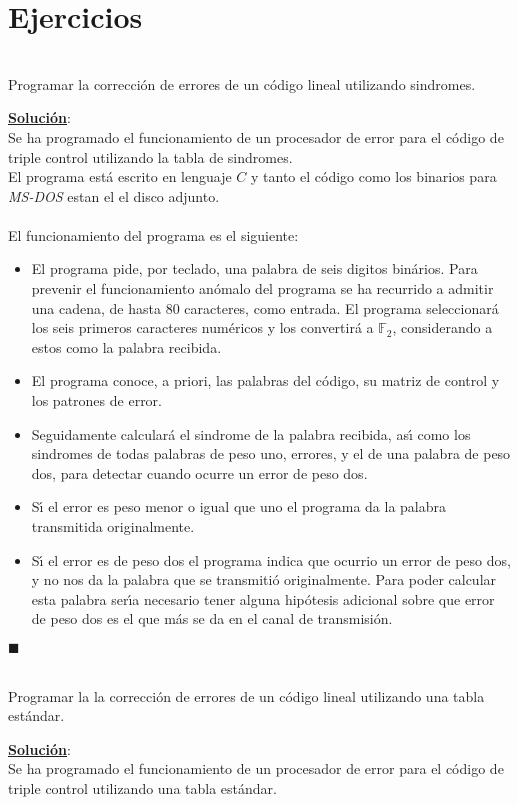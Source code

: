 %
%

\section{Ejercicios}
%
%
\begin{ejercicio}
\ \\
Programar la correcci\'on de errores de un c\'odigo lineal utilizando
sindromes.
\end{ejercicio}
\underline{\textbf{Soluci\'on}}:\\
Se ha programado el funcionamiento de un procesador de error para el 
c\'odigo de triple control utilizando la tabla de sindromes.\\

El programa est\'a escrito en lenguaje $C$ y tanto el c\'odigo como los
binarios para \emph{MS-DOS} estan el el disco adjunto.\\ \\
%
El funcionamiento del programa es el siguiente:
\begin{itemize}
\item El programa pide, por teclado, una palabra de seis digitos bin\'arios. 
Para prevenir el funcionamiento an\'omalo del programa se ha recurrido a 
admitir una cadena, de hasta $80$ caracteres, como entrada. El programa
seleccionar\'a los seis primeros caracteres num\'ericos y los convertir\'a a
$\mathbb{F}_2$, considerando a estos como la palabra recibida.
\item El programa conoce, a priori, las palabras del c\'odigo, su matriz de
control y los patrones de error.
\item Seguidamente calcular\'a el sindrome de la palabra recibida, as\'{\i}
como los sindromes de todas palabras de peso uno, errores, y el de una palabra
de peso dos, para detectar cuando ocurre un error de peso dos.
\item S\'{\i} el error es peso menor o igual que uno el programa da la palabra
transmitida originalmente.
\item S\'{\i} el error es de peso dos el programa indica que ocurrio un error
de peso dos, y no nos da la palabra que se transmiti\'o originalmente. Para
poder calcular esta palabra ser\'{\i}a necesario tener alguna hip\'otesis
adicional sobre que error de peso dos es el que m\'as se da en el canal de
transmisi\'on.
\end{itemize}

\begin{flushright}
$\blacksquare$
\end{flushright}
%
%
\begin{ejercicio}
\ \\
Programar la la correcci\'on de errores de un c\'odigo lineal utilizando una
tabla est\'andar.
\end{ejercicio}
\underline{\textbf{Soluci\'on}}:\\
Se ha programado el funcionamiento de un procesador de error para el 
c\'odigo de triple control utilizando una tabla est\'andar.\\

